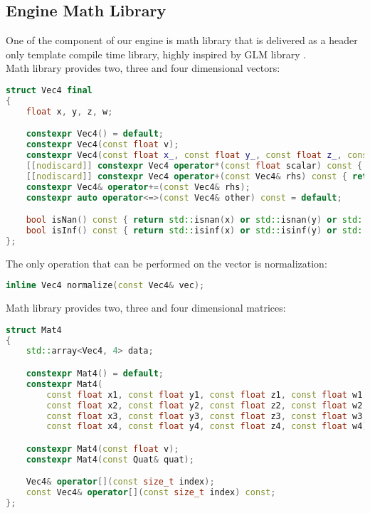 \newpage

\subsection{Engine Math Library}
\label{sec:math}
\hspace{\parindent}
One of the component of our engine is math library that is delivered as a header only template compile time library, highly inspired by GLM library \cite{glm}.\\Math library provides two, three and four dimensional vectors:
\begin{lstlisting}[language=c++, caption=Vector class (./engine/include/tsengine/math.hpp)]
struct Vec4 final
{
    float x, y, z, w;

    constexpr Vec4() = default;
    constexpr Vec4(const float v);
    constexpr Vec4(const float x_, const float y_, const float z_, const float w_);
    [[nodiscard]] constexpr Vec4 operator*(const float scalar) const { return {x * scalar, y * scalar, z * scalar, w * scalar}; }
    [[nodiscard]] constexpr Vec4 operator+(const Vec4& rhs) const { return {x + rhs.x, y + rhs.y, z + rhs.z, w + rhs.w}; }
    constexpr Vec4& operator+=(const Vec4& rhs);
    constexpr auto operator<=>(const Vec4& other) const = default;

    bool isNan() const { return std::isnan(x) or std::isnan(y) or std::isnan(z) or std::isnan(w); }
    bool isInf() const { return std::isinf(x) or std::isinf(y) or std::isinf(z) or std::isinf(w); }
};
\end{lstlisting}

The only operation that can be performed on the vector is normalization:
\begin{lstlisting}[language=c++, caption=Vector operations (./engine/include/tsengine/math.hpp)]
inline Vec4 normalize(const Vec4& vec);
\end{lstlisting}

Math library provides two, three and four dimensional matrices:
\label{sec:mat}
\begin{lstlisting}[language=c++, caption=Matrix class (./engine/include/tsengine/math.hpp)]
struct Mat4
{
    std::array<Vec4, 4> data;

    constexpr Mat4() = default;
    constexpr Mat4(
        const float x1, const float y1, const float z1, const float w1,
        const float x2, const float y2, const float z2, const float w2,
        const float x3, const float y3, const float z3, const float w3,
        const float x4, const float y4, const float z4, const float w4);

    constexpr Mat4(const float v);
    constexpr Mat4(const Quat& quat);

    Vec4& operator[](const size_t index);
    const Vec4& operator[](const size_t index) const;
};
\end{lstlisting}

